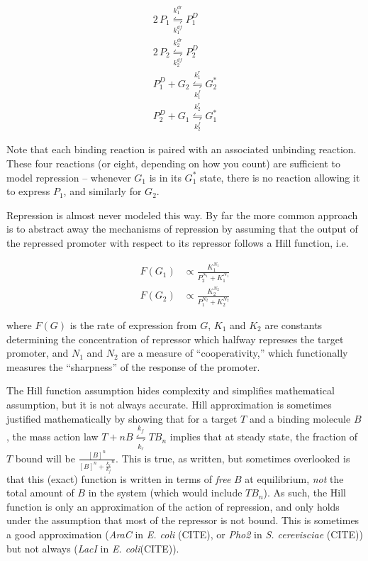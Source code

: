 \documentclass[preprint,12pt]{elsarticle}
\begin{document}
\begin{align}
	2\,P_1 \underset{k^{df}_1}{\overset{k^{dr}_1}{\leftrightharpoons}} P_1^D\\
	2\,P_2 \underset{k^{df}_2}{\overset{k^{dr}_2}{\leftrightharpoons}} P_2^D\\
	P_1^D + G_2 \underset{k_1^f}{\overset{k_1^r}{\leftrightharpoons}} G_2^*\\
	P_2^D + G_1 \underset{k_2^f}{\overset{k_2^r}{\leftrightharpoons}} G_1^*
\end{align}

Note that each binding reaction is paired with an associated unbinding reaction. These four reactions (or eight, depending on how you count) are sufficient to model repression -- whenever $G_1$ is in its $G_1^*$ state, there is no reaction allowing it to express $P_1$, and similarly for $G_2$. 

Repression is almost never modeled this way. By far the more common approach is to abstract away the mechanisms of repression by assuming that the output of the repressed promoter with respect to its repressor follows a Hill function, i.e.

\begin{align}
	F(G_1) &\propto \frac{K_1^{N_1}}{P_2^{N_1} + K_1^{N_1}}\\
	F(G_2) &\propto \frac{K_2^{N_2}}{P_1^{N_2} + K_2^{N_2}}
\end{align}

where $F(G)$ is the rate of expression from $G$, $K_1$ and $K_2$ are constants determining the concentration of repressor which halfway represses the target promoter, and $N_1$ and $N_2$ are a measure of ``cooperativity,'' which functionally measures the ``sharpness'' of the response of the promoter. 

The Hill function assumption hides complexity and simplifies mathematical assumption, but it is not always accurate. Hill approximation is sometimes justified mathematically by showing that for a target $T$ and a binding molecule $B$, the mass action law $T + nB \underset{k_r}{\overset{k_f}{\leftrightharpoons}} TB_n$ implies that at steady state, the fraction of $T$ bound will be $\frac{[B]^n}{[B]^n + \frac{k_r}{k_f}^n}$. This is true, as written, but sometimes overlooked is that this (exact) function is written in terms of \emph{free} $B$ at equilibrium, \emph{not} the total amount of $B$ in the system (which would include $TB_n$). As such, the Hill function is only an approximation of the action of repression, and only holds under the assumption that most of the repressor is not bound. This is sometimes a good approximation (\emph{AraC} in \emph{E. coli} (CITE), or \emph{Pho2} in \emph{S. cerevisciae} (CITE)) but not always (\emph{LacI} in \emph{E. coli}(CITE)). 
\end{document}

